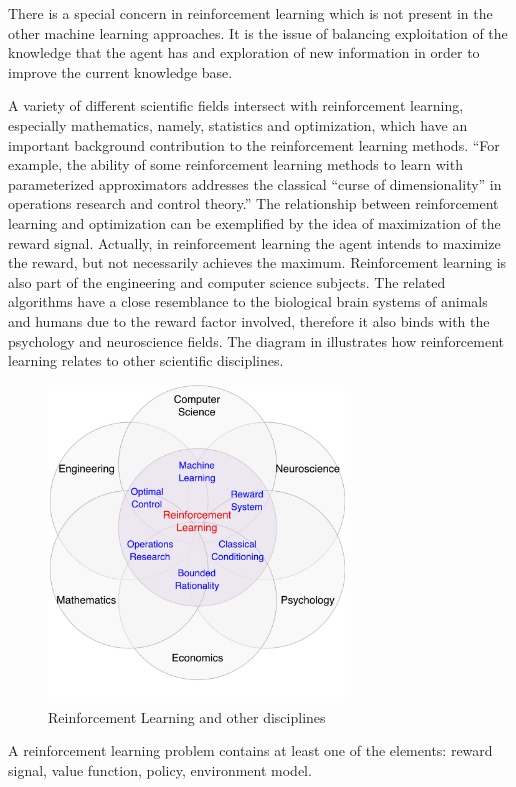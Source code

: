 There is a special concern in reinforcement learning which is not present in the other machine learning approaches. It is the issue of balancing exploitation of the knowledge that the agent has and exploration of new information in order to improve the current knowledge base.

A variety of different scientific fields intersect with reinforcement learning, especially mathematics, namely, statistics and optimization, which have an important background contribution to the reinforcement learning methods. “For example, the ability of some reinforcement learning methods to learn with parameterized approximators addresses the classical “curse of dimensionality” in operations research and control theory.” \cite{Sutton} The relationship between reinforcement learning and optimization can be exemplified by the idea of maximization of the reward signal. Actually, in reinforcement learning the agent intends to maximize the reward, but not necessarily achieves the maximum. Reinforcement learning is also part of the engineering and computer science subjects. The related algorithms have a close resemblance to the biological brain systems of animals and humans due to the reward factor involved, therefore it also binds with the psychology and neuroscience fields. The diagram in  illustrates how reinforcement learning relates to other scientific disciplines.
\begin{figure}[H]
	\centering
	\includegraphics[width=0.7\textwidth]{Figures/RLandOther}
	\caption{Reinforcement Learning and other disciplines}
	\label{fig:RLandOther}
\end{figure}
A reinforcement learning problem contains at least one of the elements: reward signal, value function, policy, environment model.


